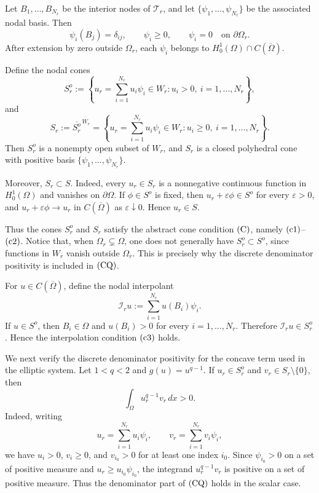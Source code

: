 \documentclass[preprint,10pt]{elsarticle}
\numberwithin{equation}{section}
\begin{document}
Let \(B_1,\ldots,B_{N_r}\) be the interior nodes of \(\mathcal T_r\), and let
\(\{\psi_1,\ldots,\psi_{N_r}\}\) be the associated nodal basis. Then
\[
\psi_i(B_j)=\delta_{ij},
\qquad
\psi_i\ge0,
\qquad
\psi_i=0 \quad\text{on }\partial\Omega_r .
\]
After extension by zero outside \(\Omega_r\), each \(\psi_i\) belongs to
\(H_0^1(\Omega)\cap C(\overline\Omega)\).

Define the nodal cones
\[
S_r^o
:=
\left\{
u_r=\sum_{i=1}^{N_r}u_i\psi_i\in W_r:
u_i>0,\ i=1,\ldots,N_r
\right\},
\]
and
\[
S_r:=\overline{S_r^o}^{\,W_r}
=
\left\{
u_r=\sum_{i=1}^{N_r}u_i\psi_i\in W_r:
u_i\ge0,\ i=1,\ldots,N_r
\right\}.
\]
Then \(S_r^o\) is a nonempty open subset of \(W_r\), and \(S_r\) is a closed
polyhedral cone with positive basis
\(\{\psi_1,\ldots,\psi_{N_r}\}\).

Moreover, \(S_r\subset S\). Indeed, every \(u_r\in S_r\) is a nonnegative
continuous function in \(H_0^1(\Omega)\) and vanishes on \(\partial\Omega\).
If \(\phi\in S^o\) is fixed, then \(u_r+\varepsilon\phi\in S^o\) for every
\(\varepsilon>0\), and \(u_r+\varepsilon\phi\to u_r\) in
\(C(\overline\Omega)\) as \(\varepsilon\downarrow0\). Hence \(u_r\in S\).

Thus the cones \(S_r^o\) and \(S_r\) satisfy the abstract cone condition
\({\rm (C)}\), namely \({\rm (c1)}\)--\({\rm (c2)}\). Notice that, when
\(\Omega_r\subsetneq\Omega\), one does not generally have
\(S_r^o\subset S^o\), since functions in \(W_r\) vanish outside
\(\Omega_r\). This is precisely why the discrete denominator positivity is
included in \({\rm (CQ)}\).

For \(u\in C(\overline\Omega)\), define the nodal interpolant
\[
\mathcal I_r u:=\sum_{i=1}^{N_r}u(B_i)\psi_i .
\]
If \(u\in S^o\), then \(B_i\in\Omega\) and \(u(B_i)>0\) for every
\(i=1,\ldots,N_r\). Therefore \(\mathcal I_r u\in S_r^o\).
Hence the interpolation condition \({\rm (c3)}\) holds.

We next verify the discrete denominator positivity for the concave term used
in the elliptic system. Let \(1<q<2\) and \(g(u)=u^{q-1}\). If
\(u_r\in S_r^o\) and \(v_r\in S_r\setminus\{0\}\), then
\[
\int_\Omega u_r^{q-1}v_r\,dx>0 .
\]
Indeed, writing
\[
u_r=\sum_{i=1}^{N_r}u_i\psi_i,
\qquad
v_r=\sum_{i=1}^{N_r}v_i\psi_i,
\]
we have \(u_i>0\), \(v_i\ge0\), and \(v_{i_0}>0\) for at least one index
\(i_0\). Since \(\psi_{i_0}>0\) on a set of positive measure and
\(u_r\ge u_{i_0}\psi_{i_0}\), the integrand \(u_r^{q-1}v_r\) is positive on a
set of positive measure. Thus the denominator part of \({\rm (CQ)}\) holds in
the scalar case.
\end{document}

